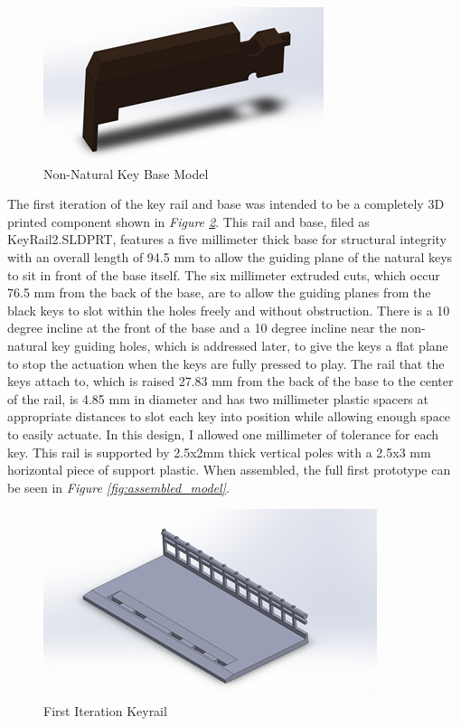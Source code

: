 \begin{figure}[h!]
  \centering
  \includegraphics[width=0.7\linewidth]{image/BlackModel.png}
  \caption{Non-Natural Key Base Model}
  \label{fig:black_model}
\end{figure}

The first iteration of the key rail and base was intended to be a completely 3D printed component shown in \textit{Figure \ref{fig:base_model1}}. This rail and base, filed as KeyRail2.SLDPRT, features a five millimeter thick base for structural integrity with an overall length of 94.5 mm to allow the guiding plane of the natural keys to sit in front of the base itself. The six millimeter extruded cuts, which occur 76.5 mm from the back of the base, are to allow the guiding planes from the black keys to slot within the holes freely and without obstruction. There is a 10 degree incline at the front of the base and a 10 degree incline near the non-natural key guiding holes, which is addressed later, to give the keys a flat plane to stop the actuation when the keys are fully pressed to play. The rail that the keys attach to, which is raised 27.83 mm from the back of the base to the center of the rail, is 4.85 mm in diameter and has two millimeter plastic spacers at appropriate distances to slot each key into position while allowing enough space to easily actuate. In this design, I allowed one millimeter of tolerance for each key. This rail is supported by 2.5x2mm thick vertical poles with a 2.5x3 mm horizontal piece of support plastic. When assembled, the full first prototype can be seen in \textit{Figure \ref{fig:assembled_model}}.

\begin{figure}[h!]
  \centering
  \includegraphics[width=0.8\linewidth]{image/BaseModel1.png}
  \caption{First Iteration Keyrail}
  \label{fig:base_model1}
\end{figure}

